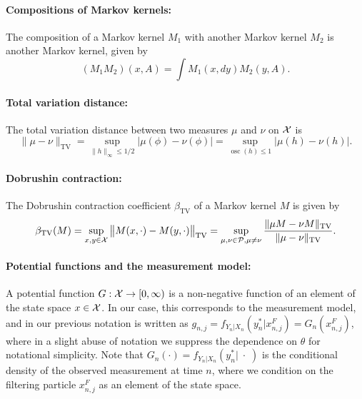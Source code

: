 \paragraph{\bf Compositions of Markov kernels:} The composition of a Markov kernel $M_1$ with another Markov kernel $M_2$ is another Markov kernel, given by 
\begin{equation}
 (M_1M_2)(x, A) = \int M_1(x, dy) M_2(y, A).
\end{equation}

\paragraph{\bf Total variation distance:} The total variation distance between two measures $\mu$ and $\nu$ on ${\mathcal{X}}$ is
\begin{equation}
\|\mu-\nu\|_{\mathrm{TV}}=\sup _{\|h\|_{\infty} \leq 1 / 2}|\mu(\phi)-\nu(\phi)|=\sup _{\operatorname{osc}(h) \leq 1}|\mu(h)-\nu(h)|.    
\end{equation}

\paragraph{\bf Dobrushin contraction:} The Dobrushin contraction coefficient $\beta_{\text{TV}}$ of a Markov kernel $M$ is given by
\begin{equation}
\beta_{\mathrm{TV}}(M)=\sup _{x, y \in {\mathcal{X}}}\big\|M(x, \cdot)-M(y, \cdot)\big\|_{\mathrm{TV}}=\sup _{\mu, \nu \in \mathcal{P}, \mu \neq \nu} \frac{\|\mu M-\nu M\|_{\mathrm{TV}}}{\|\mu-\nu\|_{\mathrm{TV}}}.    
\end{equation}

\paragraph{\bf Potential functions and the measurement model:} A potential function $G : {\mathcal{X}} \to [0,\infty)$ is a non-negative function of an element of the state space $x \in {\mathcal{X}}$. 
In our case, this corresponds to the measurement model, and in our previous notation is written as $g_{n,j} = f_{Y_n|X_n}(y_n^*|x_{n,j}^F) = G_n(x_{n,j}^F)$, where in a slight abuse of notation we suppress the dependence on $\theta$ for notational simplicity. 
Note that $G_n(\cdot) = f_{Y_n|X_n}(y_n^*|\;\cdot\;)$ is the conditional density of the observed measurement at time $n$, where we condition on the filtering particle $x_{n,j}^F$ as an element of the state space. 

